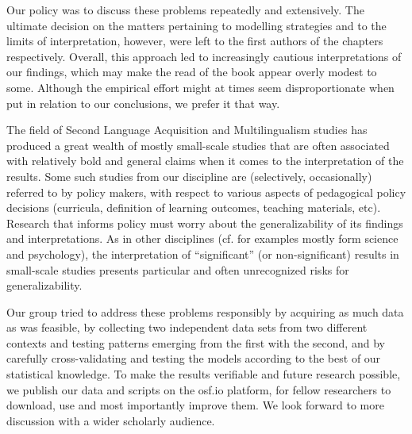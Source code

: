 \documentclass[output=paper]{langsci/langscibook}
\begin{document}
Our policy was to discuss these problems repeatedly and extensively. The ultimate decision on the matters pertaining to modelling strategies and to the limits of interpretation, however, were left to the first authors of the chapters respectively. Overall, this approach led to increasingly cautious interpretations of our findings, which may make the read of the book appear overly modest to some. Although the empirical effort might at times seem disproportionate when put in relation to our conclusions, we prefer it that way.

The field of Second Language Acquisition and Multilingualism studies has produced a great wealth of mostly small-scale studies that are often associated with relatively bold and general claims when it comes to the interpretation of the results. Some such studies from our discipline are (selectively, occasionally) referred to by policy makers, with respect to various aspects of pedagogical policy decisions (curricula, definition of learning outcomes, teaching materials, etc). Research that informs policy must worry about the generalizability of its findings and interpretations. As in other disciplines (cf. \citealt{Ritchie2020} for examples mostly form science and psychology), the interpretation of ``significant'' (or non-significant) results in small-scale studies presents particular and often unrecognized risks for generalizability.

Our group tried to address these problems responsibly by acquiring as much data as was feasible, by collecting two independent data sets from two different contexts and testing patterns emerging from the first with the second, and by carefully cross-validating and testing the models according to the best of our statistical knowledge. To make the results verifiable and future research possible, we publish our data and scripts on the osf.io platform, for fellow researchers to download, use and most importantly improve them. We look forward to more discussion with a wider scholarly audience.

{\sloppy\printbibliography[heading=subbibliography,notkeyword=this]}
\end{document}
